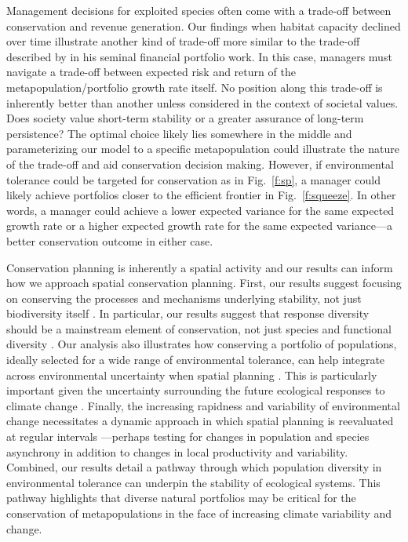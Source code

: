 Management decisions for exploited species often come with a trade-off between conservation and revenue generation. Our findings when habitat capacity declined over time illustrate another kind of trade-off more similar to the trade-off described by \citet{markowitz1952} in his seminal financial portfolio work. In this case, managers must navigate a trade-off between expected risk and return of the metapopulation/portfolio growth rate itself. No position along this trade-off is inherently better than another unless considered in the context of societal values. Does society value short-term stability or a greater assurance of long-term persistence? The optimal choice likely lies somewhere in the middle and parameterizing our model to a specific metapopulation could illustrate the nature of the trade-off and aid conservation decision making. However, if environmental tolerance could be targeted for conservation as in Fig.~\ref{f:sp}, a manager could likely achieve portfolios closer to the efficient frontier in Fig.~\ref{f:squeeze}. In other words, a manager could achieve a lower expected variance for the same expected growth rate or a higher expected growth rate for the same expected variance---a better conservation outcome in either case.

Conservation planning is inherently a spatial activity \citep{pressey2007} and our results can inform how we approach spatial conservation planning. First, our results suggest focusing on conserving the processes and mechanisms underlying stability, not just biodiversity itself \citep{pressey2007, beechie2013}. In particular, our results suggest that response diversity should be a mainstream element of conservation, not just species and functional diversity \citep{mori2013}. Our analysis also illustrates how conserving a portfolio of populations, ideally selected for a wide range of environmental tolerance, can help integrate across environmental uncertainty when spatial planning \citep{ando2012}. This is particularly important given the uncertainty surrounding the future ecological responses to climate change \citep{walther2002}. Finally, the increasing rapidness and variability of environmental change necessitates a dynamic approach in which spatial planning is reevaluated at regular intervals \citep{hannah2002a}---perhaps testing for changes in population and species asynchrony in addition to changes in local productivity and variability. Combined, our results detail a pathway through which population diversity in environmental tolerance can underpin the stability of ecological systems. This pathway highlights that diverse natural portfolios may be critical for the conservation of metapopulations in the face of increasing climate variability and change.

